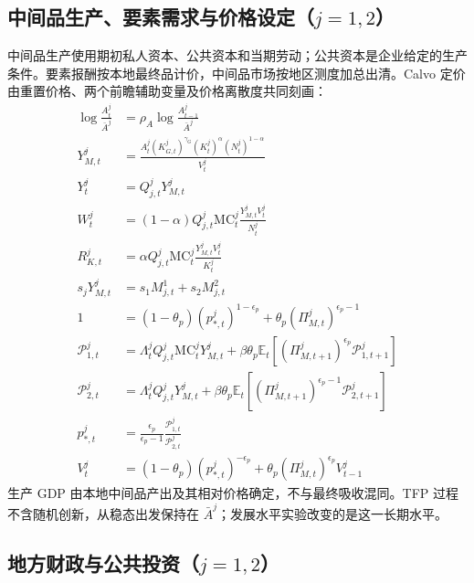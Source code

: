 \documentclass[12pt,UTF8]{ctexart}
\newcommand{\E}{\mathbb{E}}
\newcommand{\MC}{\mathrm{MC}}
\begin{document}
	\subsection{中间品生产、要素需求与价格设定（\texorpdfstring{$j=1,2$}{j=1,2}）}
	中间品生产使用期初私人资本、公共资本和当期劳动；公共资本是企业给定的生产条件。要素报酬按本地最终品计价，中间品市场按地区测度加总出清。Calvo 定价由重置价格、两个前瞻辅助变量及价格离散度共同刻画：
	\begin{align}
		\log\frac{A_t^j}{\bar A^j} &=\rho_A\log\frac{A_{t-1}^j}{\bar A^j} \label{a17}\\
		Y_{M,t}^j &=\frac{A_t^j(K_{G,t}^j)^{\gamma_G}(K_t^j)^{\alpha}(N_t^j)^{1-\alpha}}{V_t^j} \label{a18}\\
		Y_t^j&=Q_{j,t}^jY_{M,t}^j \label{a18x}\\
		W_t^j &=(1-\alpha)Q_{j,t}^j\MC_t^j\frac{Y_{M,t}^jV_t^j}{N_t^j} \label{a19}\\
		R_{K,t}^j &=\alpha Q_{j,t}^j\MC_t^j\frac{Y_{M,t}^jV_t^j}{K_t^j} \label{a20}\\
		s_jY_{M,t}^j &=s_1M_{j,t}^1+s_2M_{j,t}^2 \label{a21}\\
		1 &=(1-\theta_p)(p_{*,t}^j)^{1-\epsilon_p}+\theta_p(\Pi_{M,t}^j)^{\epsilon_p-1} \label{a22}\\
		\mathcal P_{1,t}^j &=\Lambda_{t}^jQ_{j,t}^j\MC_t^jY_{M,t}^j +\beta\theta_p\E_t\left[(\Pi_{M,t+1}^j)^{\epsilon_p}\mathcal P_{1,t+1}^j\right] \label{a23}\\
		\mathcal P_{2,t}^j &=\Lambda_{t}^jQ_{j,t}^jY_{M,t}^j +\beta\theta_p\E_t\left[(\Pi_{M,t+1}^j)^{\epsilon_p-1}\mathcal P_{2,t+1}^j\right] \label{a24}\\
		p_{*,t}^j &=\frac{\epsilon_p}{\epsilon_p-1}\frac{\mathcal P_{1,t}^j}{\mathcal P_{2,t}^j} \label{a25}\\
		V_t^j &=(1-\theta_p)(p_{*,t}^j)^{-\epsilon_p}+\theta_p(\Pi_{M,t}^j)^{\epsilon_p}V_{t-1}^j \label{a26}
	\end{align}
	生产 GDP 由本地中间品产出及其相对价格确定，不与最终吸收混同。TFP 过程不含随机创新，从稳态出发保持在 $\bar A^j$；发展水平实验改变的是这一长期水平。
	
	\subsection{地方财政与公共投资（\texorpdfstring{$j=1,2$}{j=1,2}）}
	
\end{document}
